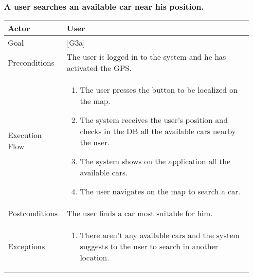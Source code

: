 \documentclass{article}
\begin{document}
	\subsubsection{A user searches an available car near his position.}
	\begin{tabularx}{\textwidth}{  l  X  }
		\hline
		Actor & User\\
		\hline
		Goal & [G3a]\\
		\hline
		Preconditions & The user is logged in to the system and he has activated the GPS.\\
		\hline
		Execution Flow & \begin{enumerate}
			\item{The user presses the button to be localized on the map.}
										 \item{The system receives the user's position and checks in the DB all the available cars nearby the user.}
										 \item{The system shows on the application all the available cars.}
										 \item{The user navigates on the map to search a car.}
										\end{enumerate}\\
		\hline
		Postconditions & The user finds a car most suitable for him.\\
		\hline
		Exceptions & \begin{enumerate}
			\item{There aren't any available cars and the system suggests to the user to search in another location.}
			\end{enumerate}\\
		\hline
	\end{tabularx}
\end{document}
